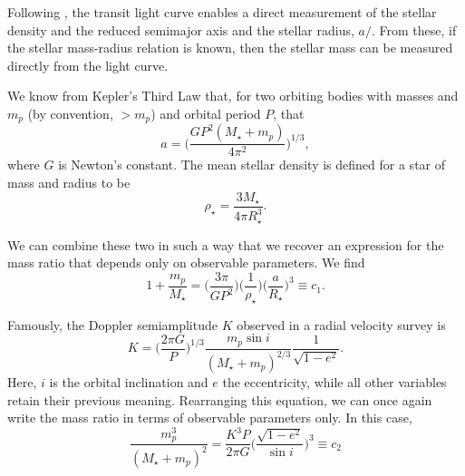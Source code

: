 Following \citet{Seager03}, the transit light curve enables a direct measurement of the stellar density \rhostar{} and the reduced semimajor axis and the stellar radius, $a/$\rstar. 
From these, if the stellar mass-radius relation is known, then the stellar mass can be measured directly from the light curve. 

We know from Kepler's Third Law that, for two orbiting bodies with masses \mstar{} and $m_p$ (by convention, \mstar$ > m_p$) and orbital period $P$, that
\begin{equation}
a = \bigg(\frac{GP^2(M_\star+m_p)}{4\pi^2}\bigg)^{1/3},
\end{equation}
where $G$ is Newton's constant.
The mean stellar density is defined for a star of mass \mstar{} and radius \rstar{} to be
\begin{equation}
\rho_\star = \frac{3M_\star}{4 \pi R_\star^3}.
\label{Eq:Density}
\end{equation}

We can combine these two in such a way that we recover an expression for the mass ratio that depends only on observable parameters. We find
\begin{equation}
1 + \frac{m_p}{M_\star} = \bigg(\frac{3\pi}{GP^2}\bigg) \bigg(\frac{1}{\rho_\star}\bigg) \bigg(\frac{a}{R_\star}\bigg)^3 \equiv c_1.
\end{equation}

Famously, the Doppler semiamplitude $K$ observed in a radial velocity survey is 
\begin{equation}
K = \bigg(\frac{2\pi G}{P}\bigg)^{1/3} \frac{m_p \sin{i}}{(M_\star + m_p)^{2/3}}\frac{1}{\sqrt{1-e^2}}.
\end{equation}
Here, $i$ is the orbital inclination and $e$ the eccentricity, while all other variables retain their previous meaning.
Rearranging this equation, we can once again write the mass ratio in terms of observable parameters only. In this case,
\begin{equation}
\frac{m_p^3}{(M_\star + m_p)^2} = \frac{K^3 P}{2\pi G} \bigg(\frac{\sqrt{1-e^2}}{\sin{i}}\bigg)^3 \equiv c_2
\end{equation}


